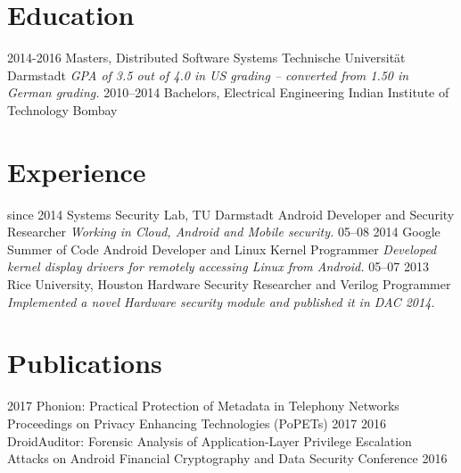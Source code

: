 \documentclass[]{friggeri-cv}
\begin{document}
\section{Education}
\begin{entrylist}
  \entry
    {2014-2016}
    {Masters, {\normalfont Distributed Software Systems}}
    {Technische Universität Darmstadt}
    {\emph{GPA of 3.5 out of 4.0 in US grading -- converted from 1.50 in German grading.}}
  \entry
    {2010–2014}
    {Bachelors, {\normalfont Electrical Engineering}}
    {Indian Institute of Technology Bombay}
    {}%
\end{entrylist}

\section{Experience}
\begin{entrylist}
  \entry
    {since 2014}
    {Systems Security Lab, TU Darmstadt}
    {Android Developer and Security Researcher}
    {\emph{Working in Cloud, Android and Mobile security.}}
  \entry
    {05–08 2014}
    {Google Summer of Code}
    {Android Developer and Linux Kernel Programmer}
    {\emph{Developed kernel display drivers for remotely accessing Linux from Android.}}
  \entry
    {05–07 2013}
    {Rice University, Houston}
    {Hardware Security Researcher and Verilog Programmer}
    {\emph{Implemented a novel Hardware security module and published it in DAC 2014.}}
\end{entrylist}

\section{Publications}
\begin{entrylist}
  \entry
    {2017}
    {Phonion: Practical Protection of Metadata in Telephony Networks}
    {Proceedings on Privacy Enhancing Technologies (PoPETs) 2017}
    {}
  \entry
    {2016}
    {DroidAuditor: Forensic Analysis of Application-Layer Privilege Escalation Attacks on Android}
    {Financial Cryptography and Data Security Conference 2016}
    {}

\end{entrylist}
\end{document}
